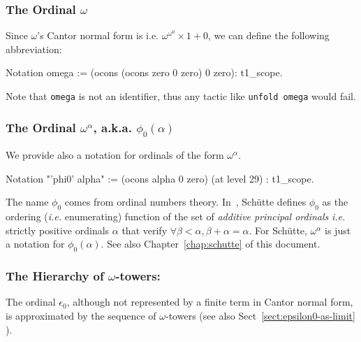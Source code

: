 \subsubsection{The Ordinal \(\omega\)}
\label{sec:orgheadline68}

  Since \(\omega\)'s Cantor normal form is
i.e. \(\omega^{\omega^0}\times 1+ 0\), we can define the following abbreviation:

\label{sect:omega-notation2}
\begin{Coqsrc}
Notation omega := (ocons (ocons zero 0 zero) 0 zero): t1_scope.
\end{Coqsrc}

Note that \texttt{omega} is not an identifier, thus any tactic like \texttt{unfold omega} would fail.


\subsubsection{The Ordinal \(\omega^\alpha\), a.k.a. \(\phi_0(\alpha)\)}
\label{sect:notation-phi0}
We provide also a notation for ordinals of the form $\omega^\alpha$.


\begin{Coqsrc}
Notation "'phi0' alpha" := (ocons alpha 0 zero) (at level 29) : t1_scope.
\end{Coqsrc}


\begin{remark}
\label{sec:orgheadline69}
The name \(\phi_0\)
   comes from ordinal numbers theory. In~\cite{schutte}, Schütte defines 
$\phi_0$  as the ordering (\emph{i.e.} enumerating) function of the set  of \emph{additive principal ordinals} \emph{i.e.} strictly positive ordinals $\alpha$ that verify $\forall \beta<\alpha, \beta+\alpha=\alpha$. For Schütte,  $\omega^\alpha$ is just a notation for $\phi_0(\alpha)$.  See also Chapter~\ref{chap:schutte} of this document.
\end{remark}



  
\subsubsection{The Hierarchy of \(\omega\)-towers:}
\label{sec:orgheadline71}

The ordinal $\epsilon_0$, although not represented by a finite term in Cantor normal form, is approximated by the sequence of $\omega$-towers (see also Sect~\vref{sect:epsilon0-as-limit} ).


